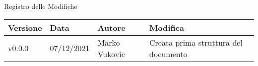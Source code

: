 \begin{center}
  \huge{Registro delle Modifiche}
\end{center}

\begin{center}
  \begin{tabular}{|p{2cm}|p{2cm}|p{3cm}|p{5cm}|}
    \hline
    \textbf{Versione} & \textbf{Data} & \textbf{Autore} & \textbf{Modifica}                    \\ \hline
    v0.0.0            & 07/12/2021    & Marko Vukovic   & Creata prima struttura del documento \\ \hline
  \end{tabular}
\end{center}
